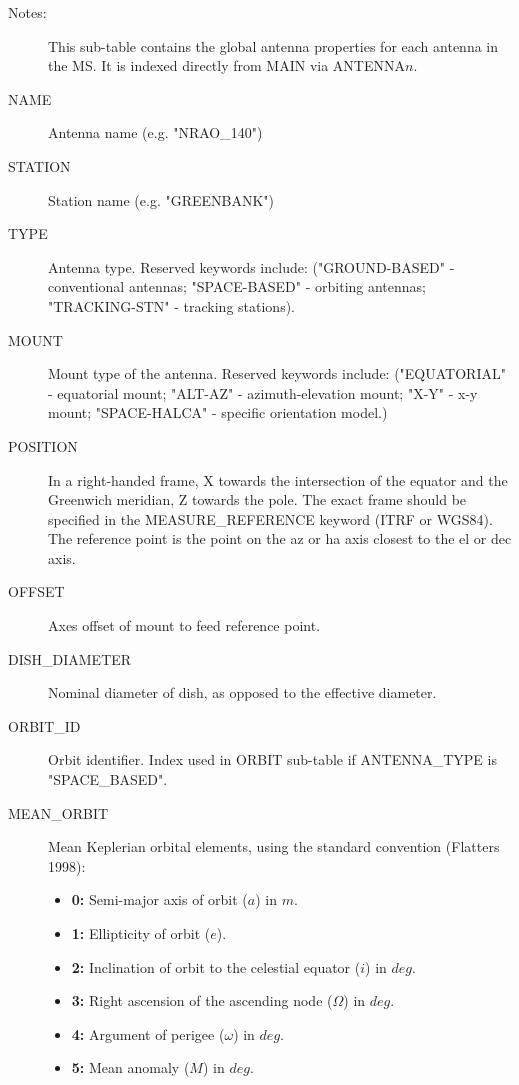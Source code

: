 \documentclass{article}
\begin{document}
\begin{description}

\item[Notes:] This sub-table contains the global antenna properties
for each antenna in the MS. It is indexed directly from MAIN via
ANTENNA$n$.

\item[NAME] Antenna name (e.g. "NRAO\_140")

\item[STATION] Station name (e.g. "GREENBANK")

\item[TYPE] Antenna type. Reserved keywords include:
("GROUND-BASED" - conventional antennas; "SPACE-BASED" - orbiting
antennas; "TRACKING-STN" - tracking stations).

\item[MOUNT] Mount type of the antenna. Reserved keywords include:
("EQUATORIAL" - equatorial mount; "ALT-AZ" - azimuth-elevation mount; "X-Y"
- x-y mount; "SPACE-HALCA" - specific orientation model.)

\item[POSITION] In a right-handed frame, X towards the intersection of
the equator and the Greenwich meridian, Z towards the pole. The exact
frame should be specified in the MEASURE\_REFERENCE keyword (ITRF or
WGS84). The reference point is the point on the az or ha axis closest
to the el or dec axis.

\item[OFFSET] Axes offset of mount to feed reference point.

\item[DISH\_DIAMETER] Nominal diameter of dish, as opposed to the
effective diameter.

\item[ORBIT\_ID] Orbit identifier. Index used in ORBIT sub-table if
ANTENNA\_TYPE is "SPACE\_BASED".

\item[MEAN\_ORBIT] Mean Keplerian orbital elements, using the
standard convention (Flatters 1998): 
\begin{itemize}
   \item{{\bf 0:} Semi-major axis of orbit ($a$) in $m$.}
   \item{{\bf 1:} Ellipticity of orbit ($e$).}
   \item{{\bf 2:} Inclination of orbit to the celestial equator ($i$) 
                  in $deg.$}
   \item{{\bf 3:} Right ascension of the ascending node ($\Omega$) in $deg.$}
   \item{{\bf 4:} Argument of perigee ($\omega$) in $deg.$}
   \item{{\bf 5:} Mean anomaly ($M$) in $deg.$}
\end{itemize}


\end{description}
\end{document}
